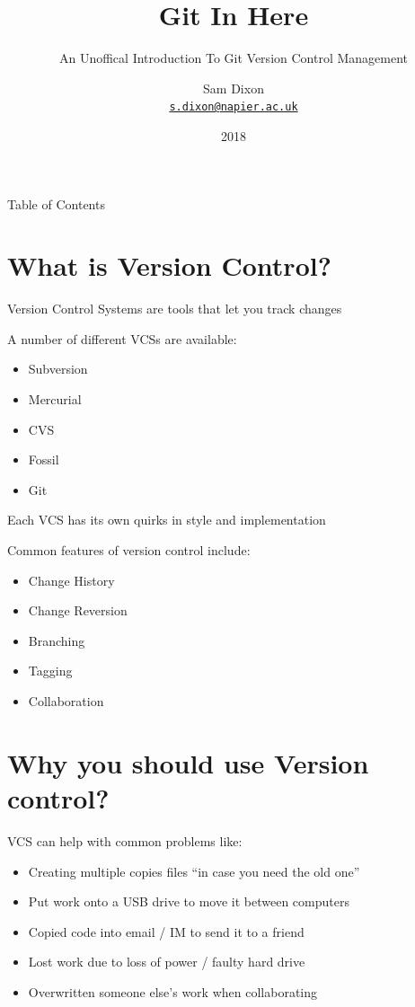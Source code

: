 \documentclass{beamer}
\title{Git In Here}
\subtitle{An Unoffical Introduction To Git Version Control Management}
\author{Sam Dixon\\
{\tt \href{mailto:s.dixon@napier.ac.uk}{s.dixon@napier.ac.uk}}}
\date{2018}
\begin{document}
\frame{\titlepage}


\begin{frame}{Table of Contents}
    \tableofcontents
\end{frame}


\section{What is Version Control?}
\begin{frame}[allowframebreaks]{\secname}
    Version Control Systems are tools that let you track changes    
    
    A number of different VCSs are available:
    \begin{itemize}
    \item Subversion
    \item Mercurial
    \item CVS
    \item Fossil
    \item Git
    \end{itemize}
    Each VCS has its own quirks in style and implementation 

\framebreak

    Common features of version control include:
    \begin{itemize}
    \item Change History
    \item Change Reversion  
    \item Branching
    \item Tagging
    \item Collaboration
    \end{itemize}
\end{frame}


\section{Why you should use Version control?}
\begin{frame}{\secname}
    VCS can help with common problems like:

    \begin{itemize}
    \item Creating multiple copies files ``in case you need the old one''
    \item Put work onto a USB drive to move it between computers
    \item Copied code into email / IM to send it to a friend
    \item Lost work due to loss of power / faulty hard drive
    \item Overwritten someone else's work when collaborating
    \end{itemize}
\end{frame}
\end{document}
